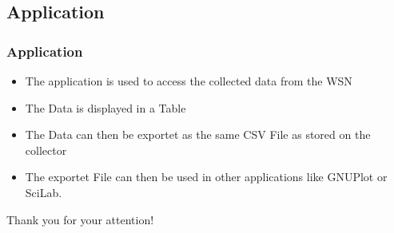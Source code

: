 \documentclass{beamer}
\begin{document}
\subsection{Application}
\frame
{
	\frametitle{Application}
	
	\begin{itemize}
	
	\item The application is used to access the collected data from the WSN
	
	\item The Data is displayed in a Table
	
	\item The Data can then be exportet as the same CSV File as stored on the collector
	
	
	\item The exportet File can then be used in other applications like GNUPlot or SciLab.
	
	\end{itemize}

}




\frame
{
	\begin{center}
	Thank you for your attention!
	\end{center}
}
\end{document}
